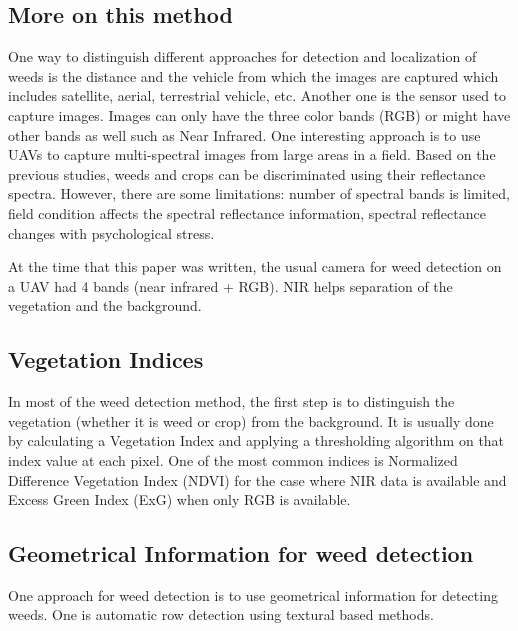 \documentclass{article}
\begin{document}
	\subsection{More on this method}
	
	One way to distinguish different approaches for detection and localization of weeds is the distance and the vehicle from which the images are captured which includes satellite, aerial, terrestrial vehicle, etc. Another one is the sensor used to capture images. Images can only have the three color bands (RGB) or might have other bands as well such as Near Infrared. One interesting approach is to use UAVs to capture multi-spectral images from large areas in a field. Based on the previous studies, weeds and crops can be discriminated using their reflectance spectra. However, there are some limitations: number of spectral bands is limited, field condition affects the spectral reflectance information, spectral reflectance changes with psychological stress. 
	
	At the time that this paper was written, the usual camera for weed detection on a UAV had 4 bands (near infrared + RGB). NIR helps separation of the vegetation and the background. 
	
	\subsection{Vegetation Indices}
	
	In most of the weed detection method, the first step is to distinguish the vegetation (whether it is weed or crop) from the background. It is usually done by calculating a Vegetation Index and applying a thresholding algorithm on that index value at each pixel. One of the most common indices is Normalized Difference Vegetation Index (NDVI) for the case where NIR data is available and Excess Green Index (ExG) when only RGB is available. 
	
	\subsection{Geometrical Information for weed detection}
	
	One approach for weed detection is to use geometrical information for detecting weeds. One is automatic row detection using textural based methods. 


	
\end{document}
